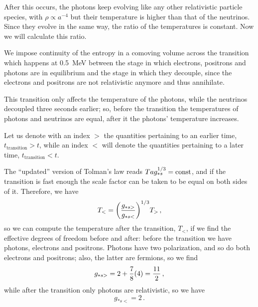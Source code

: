\documentclass[main.tex]{subfiles}
\begin{document}

After this occurs, the photons keep evolving like any other relativistic particle species, with \(\rho \propto a^{-4}\) but their temperature is higher than that of the neutrinos. Since they evolve in the same way, the ratio of the temperatures is constant.
Now we will calculate this ratio.

We impose continuity of the entropy in a comoving volume across the transition which happens at \SI{0.5}{MeV} between the stage in which electrons, positrons and photons are in equilibrium and the stage in which they decouple, since the electrons and positrons are not relativistic anymore and thus annihilate.

This transition only affects the temperature of the photons, while the neutrinos decoupled three seconds earlier; so, before the transition the temperatures of photons and neutrinos are equal, after it the photons' temperature increases.

Let us denote with an index \(>\) the quantities pertaining to an earlier time, \(t _{\text{transition}} > t\), while an index \(<\) will denote the quantities pertaining to a later time, \(t _{\text{transition}} < t\). 

The ``updated'' version of Tolman's law reads \(T a g_{*s}^{1/3} = \text{const}\),  and if the transition is fast enough the scale factor can be taken to be equal on both sides of it.
Therefore, we have 
%
\begin{equation}
  T_{<} = \qty(\frac{g_{*s>}}{g_{*s<}})^{1/3} T_{>}
\,,
\end{equation}
%
so we can compute the temperature after the transition, \(T_<\), if we find the effective degrees of freedom before and after: before the transition we have photons, electrons and positrons. Photons have two polarization, and so do both electrons and positrons; also, the latter are fermions, so we find
%
\begin{equation}
  g_{* s>} = 2 + \frac{7}{8}\qty(4) = \frac{11}{2}
\,,
\end{equation}
%
while after the transition only photons are relativistic, so we have 
%
\begin{equation}
  g_{*s<} = 2
\,.
\end{equation}
\end{document}
